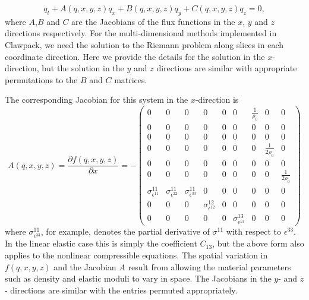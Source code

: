 \documentclass{article}
\begin{document}
\begin{equation}\label{quasilin}
	q_t + A(q,x,y,z) q_x + B(q,x,y,z) q_y + C(q,x,y,z) q_z = 0, 
\end{equation}
where $A$,$B$ and $C$ are the Jacobians of the flux functions in the $x$, $y$ and $z$ directions 
respectively.  For the multi-dimensional methods implemented in Clawpack, we need the solution to 
the Riemann problem along slices in each coordinate direction.  Here we provide the details for the 
solution in the $x$-direction, but the solution in the $y$ and $z$ directions are similar with appropriate 
permutations to the $B$ and $C$ matrices. 

The corresponding Jacobian for this system in the $x$-direction is
\begin{equation}
A(q,x,y,z) = \frac{\partial f(q,x,y,z)}{\partial x}
= -\left(\begin{array}{ccccccccc}0&0&0&0&0&0&\frac{1}{\rho_0}&0&0\\ 
0&0&0&0&0&0&0&0&0\\0&0&0&0&0&0&0&0&0\\0&0&0&0&0&0&0&\frac{1}{2\rho_0}&0\\
0&0&0&0&0&0&0&0&0\\0&0&0&0&0&0&0&0&\frac{1}{2\rho_0}\\ \sigma^{11}_{\epsilon^{11}} & 
\sigma^{11}_{\epsilon^{22}} &\sigma^{11}_{\epsilon^{33}} & 0 &0 &0 &0&0&0\\0&0&0&
\sigma^{12}_{\epsilon^{12}}&0&0&0&0&0\\0&0&0&0&0&\sigma^{13}_{\epsilon^{13}}&0&0&0 \end{array} 
\right)
\label{eqn:jac3dlgeul}
\end{equation}
where $\sigma^{11}_{\epsilon^{33}}$, for example, denotes the partial derivative of
$\sigma^{11}$ with respect to $\epsilon^{33}$.  In the linear elastic case this is
simply the coefficient $C_{13}$, but the above form also applies to the nonlinear
compressible equations.
The  spatial variation in  $f(q,x,y,z)$ and the Jacobian $A$ result from 
allowing the material parameters such as density and elastic moduli to vary
in space.
The Jacobians in the $y$- and $z$- directions are similar with the entries permuted appropriately. 
\end{document}
